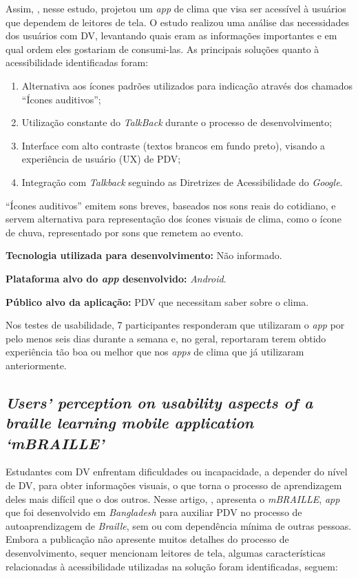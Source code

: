 Assim, , nesse estudo, projetou um \emph{app} de clima que visa ser acessível à usuários que dependem de leitores de tela.
O estudo realizou uma análise das necessidades dos usuários com DV, levantando quais eram as informações importantes e em qual ordem eles gostariam de consumi-las.
As principais soluções quanto à acessibilidade identificadas foram:

\begin{enumerate}
\item Alternativa aos ícones padrões utilizados para indicação através dos chamados ``Ícones auditivos'';
\item Utilização constante do \emph{TalkBack} durante o processo de desenvolvimento;
\item Interface com alto contraste (textos brancos em fundo preto), visando a experiência de usuário (UX) de PDV\@;
\item Integração com \emph{Talkback} seguindo as Diretrizes de Acessibilidade do \emph{Google}.
\end{enumerate}

``Ícones auditivos'' emitem sons breves, baseados nos sons reais do cotidiano, e servem alternativa para representação dos ícones visuais de clima, como o ícone de chuva, representado por sons que remetem ao evento.

\textbf{Tecnologia utilizada para desenvolvimento:} Não informado.

\textbf{Plataforma alvo do \emph{app} desenvolvido:} \emph{Android}.

\textbf{Público alvo da aplicação:} PDV que necessitam saber sobre o clima\@.

Nos testes de usabilidade, 7 participantes responderam que utilizaram o \emph{app} por pelo menos seis dias durante a semana e, no geral, reportaram terem obtido experiência tão boa ou melhor que nos \emph{apps} de clima que já utilizaram anteriormente.

\subsection{\emph{Users’ perception on usability aspects of a braille learning mobile application ‘mBRAILLE’}}

Estudantes com DV enfrentam dificuldades ou incapacidade, a depender do nível de DV, para obter informações visuais, o que torna o processo de aprendizagem deles mais difícil que o dos outros.
Nesse artigo, , apresenta o \emph{mBRAILLE}, \emph{app} que foi desenvolvido em \emph{Bangladesh} para auxiliar PDV no processo de autoaprendizagem de \emph{Braille}, sem ou com dependência mínima de outras pessoas.
Embora a publicação não apresente muitos detalhes do processo de desenvolvimento, sequer mencionam leitores de tela, algumas características relacionadas à acessibilidade utilizadas na solução foram identificadas, seguem:

